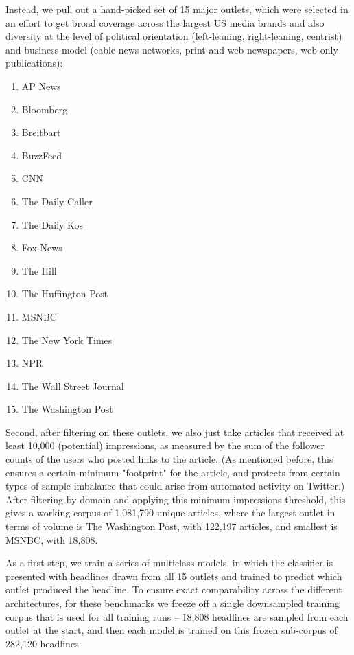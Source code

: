 \documentclass{scrartcl}
\begin{document}
Instead, we pull out a hand-picked set of 15 major outlets, which were selected in an effort to get broad coverage across the largest US media brands and also diversity at the level of political orientation (left-leaning, right-leaning, centrist) and business model (cable news networks, print-and-web newspapers, web-only publications):

\begin{enumerate}
  \item AP News
  \item Bloomberg
  \item Breitbart
  \item BuzzFeed
  \item CNN
  \item The Daily Caller
  \item The Daily Kos
  \item Fox News
  \item The Hill
  \item The Huffington Post
  \item MSNBC
  \item The New York Times
  \item NPR
  \item The Wall Street Journal
  \item The Washington Post
\end{enumerate}

Second, after filtering on these outlets, we also just take articles that received at least 10,000 (potential) impressions, as measured by the sum of the follower counts of the users who posted links to the article. (As mentioned before, this ensures a certain minimum "footprint" for the article, and protects from certain types of sample imbalance that could arise from automated activity on Twitter.) After filtering by domain and applying this minimum impressions threshold, this gives a working corpus of 1,081,790 unique articles, where the largest outlet in terms of volume is The Washington Post, with 122,197 articles, and smallest is MSNBC, with 18,808.

As a first step, we train a series of multiclass models, in which the classifier is presented with headlines drawn from all 15 outlets and trained to predict which outlet produced the headline. To ensure exact comparability across the different architectures, for these benchmarks we freeze off a single downsampled training corpus that is used for all training runs -- 18,808 headlines are sampled from each outlet at the start, and then each model is trained on this frozen sub-corpus of 282,120 headlines.
\end{document}
